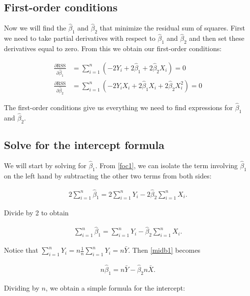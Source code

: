 \documentclass[12pt]{exam}
\begin{document}
\subsection*{First-order conditions}

\noindent Now we will find the $\hat{\beta}_1$ and $\hat{\beta}_2$ that minimize the residual sum of squares. First we need to take partial derivatives with respect to $\hat{\beta}_1$ and $\hat{\beta}_2$ and then set these derivatives equal to zero. From this we obtain our first-order conditions:

\begin{align}
\frac{\partial \text{RSS}}{\partial \hat{\beta}_1} &= \sum_{i=1}^n (-2Y_i + 2\hat{\beta}_1 + 2\hat{\beta}_2X_i) = 0 \label{foc1} \\ 
\frac{\partial \text{RSS}}{\partial \hat{\beta}_2} &= \sum_{i=1}^n (-2Y_i X_i + 2\hat{\beta}_1X_i + 2\hat{\beta}_2X_i^2) = 0 \label{foc2}
\end{align}

\noindent The first-order conditions give us everything we need to find expressions for $\hat{\beta}_1$ and $\hat{\beta}_2$. 

\subsection*{Solve for the intercept formula}

\noindent We will start by solving for $\hat{\beta}_1$. From \autoref{foc1}, we can isolate the term involving $\hat{\beta}_1$ on the left hand by subtracting the other two terms from both sides:

\begin{align}
2 \sum_{i=1}^n \hat{\beta}_1 = 2 \sum_{i=1}^n Y_i - 2 \hat{\beta}_2 \sum_{i=1}^n X_i.
\end{align}

\noindent Divide by 2 to obtain

\begin{align}
\sum_{i=1}^n \hat{\beta}_1 = \sum_{i=1}^n Y_i - \hat{\beta}_2 \sum_{i=1}^n X_i. \label{midb1}
\end{align}

\noindent Notice that $\sum_{i=1}^n Y_i = n \frac{1}{n} \sum_{i=1}^n Y_i = n \bar{Y}$. Then \autoref{midb1} becomes

\begin{align}
n \hat{\beta}_1 = n \bar{Y} - \hat{\beta}_2 n \bar{X}.
\end{align}

\noindent Dividing by $n$, we obtain a simple formula for the intercept:
\end{document}
